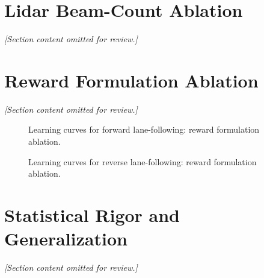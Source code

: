 \section{Lidar Beam-Count Ablation}
\label{sec:lidar_ablation}
\textit{[Section content omitted for review.]}

\begin{table}[H]
\centering
\caption{Lidar beam-count ablation on forward lane-following (dense reward, no obstacles, 30~eval episodes).}
\label{tab:lidar_beams_forward}
\end{table}

\section{Reward Formulation Ablation}
\label{sec:reward_ablation}
\textit{[Section content omitted for review.]}

\begin{figure}[H]
    \centering
    \caption{Learning curves for forward lane-following: reward formulation ablation.}
    \label{fig:forward_reward_ablation}
\end{figure}

\begin{figure}[H]
    \centering
    \caption{Learning curves for reverse lane-following: reward formulation ablation.}
    \label{fig:reverse_reward_ablation}
\end{figure}

\begin{table}[H]
\centering
\caption{Forward lane-following: reward formulation ablation (lidar-24 obs, no obstacles, 30~eval episodes).}
\label{tab:reward_ablation_forward}
\end{table}
\begin{table}[H]
\centering
\caption{Reverse lane-following: reward formulation ablation (lidar-24 obs, no obstacles, 30~eval episodes).}
\label{tab:reward_ablation_reverse}
\end{table}

\section{Statistical Rigor and Generalization}
\textit{[Section content omitted for review.]}

